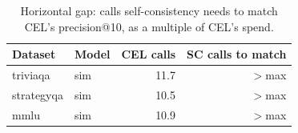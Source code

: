 \begin{table}[t]
\centering
\small
\begin{tabular}{llrr}
\toprule
Dataset & Model & CEL calls & SC calls to match \\
\midrule
triviaqa & sim & 11.7 & $>$max \\
strategyqa & sim & 10.5 & $>$max \\
mmlu & sim & 10.9 & $>$max \\
\bottomrule
\end{tabular}
\caption{Horizontal gap: calls self-consistency needs to match CEL's precision@10, as a multiple of CEL's spend.}
\label{tab:hgap}
\end{table}

